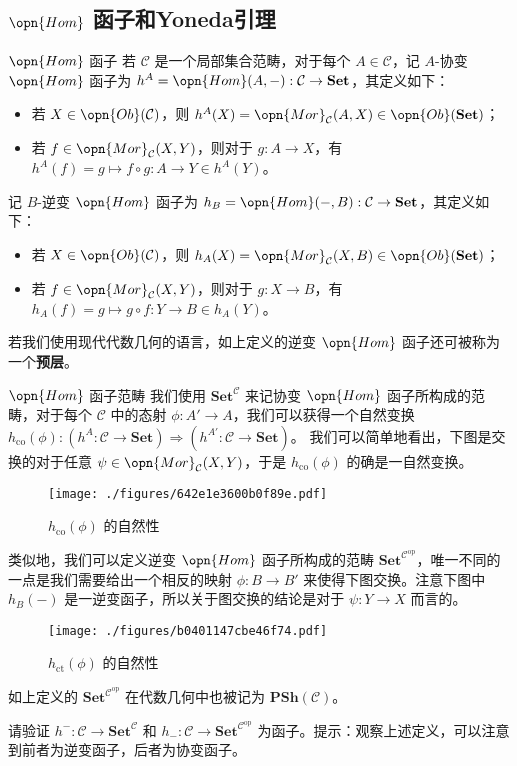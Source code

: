 \subsection{$\opn{Hom}$ 函子和Yoneda引理}
\begin{definition}{$\opn{Hom}$ 函子}
若 $\mathcal{C}$ 是一个局部集合范畴，对于每个 $A\in\mathcal{C}$，记 $A$-协变 $\opn{Hom}$ 函子为 $h^A=\opn{Hom}(A,-):\mathcal{C}\to\mathbf{Set}$，其定义如下：
\begin{itemize}
\item 若 $X\in\opn{Ob}(\mathcal{C})$，则 $h^A(X)=\opn{Mor}_\mathcal{C}(A,X)\in\opn{Ob}(\mathbf{Set})$；
\item 若 $f\in\opn{Mor}_\mathcal{C}(X,Y)$，则对于 $g:A\to X$，有 $h^A(f)=g\mapsto f\circ g:A\to Y\in h^A(Y)$。
\end{itemize}

记 $B$-逆变 $\opn{Hom}$ 函子为 $h_B=\opn{Hom}(-,B):\mathcal{C}\to\mathbf{Set}$，其定义如下：
\begin{itemize}
\item 若 $X\in\opn{Ob}(\mathcal{C})$，则 $h_A(X)=\opn{Mor}_\mathcal{C}(X,B)\in\opn{Ob}(\mathbf{Set})$；
\item 若 $f\in\opn{Mor}_\mathcal{C}(X,Y)$，则对于 $g:X\to B$，有 $h_A(f)=g\mapsto g\circ f:Y\to B\in h_A(Y)$。
\end{itemize}
\end{definition}
若我们使用现代代数几何的语言，如上定义的逆变 $\opn{Hom}$ 函子还可被称为一个\textbf{预层}。
\begin{definition}{$\opn{Hom}$ 函子范畴}
我们使用 $\mathbf{Set}^\mathcal{C}$ 来记协变 $\opn{Hom}$ 函子所构成的范畴，对于每个 $\mathcal{C}$ 中的态射 $\phi:A'\to A$，我们可以获得一个自然变换 $h_{\text{co}}(\phi):(h^A:\mathcal{C}\to\mathbf{Set})\Rightarrow(h^{A'}:\mathcal{C}\to\mathbf{Set})$。
我们可以简单地看出，下图是交换的对于任意 $\psi\in\opn{Mor}_\mathcal{C}(X,Y)$，于是 $h_\text{co}(\phi)$ 的确是一自然变换。
\begin{figure}[h!]
\centering
\texttt{[image: ./figures/642e1e3600b0f89e.pdf]}
\caption{$h_{\text{co}}(\phi)$ 的自然性} \label{fig_Cat_1}
\end{figure}
类似地，我们可以定义逆变 $\opn{Hom}$ 函子所构成的范畴 $\mathbf{Set}^{\mathcal{C}^\text{op}}$，唯一不同的一点是我们需要给出一个相反的映射 $\phi:B\to B'$ 来使得下图交换。注意下图中 $h_B(-)$ 是一逆变函子，所以关于图交换的结论是对于 $\psi:Y\to X$ 而言的。
\begin{figure}[ht]
\centering
\texttt{[image: ./figures/b0401147cbe46f74.pdf]}
\caption{$h_{\text{ct}}(\phi)$ 的自然性} \label{fig_Cat_2}
\end{figure}
\end{definition}
如上定义的 $\mathbf{Set}^{\mathcal{C}^\text{op}}$ 在代数几何中也被记为 $\mathbf{PSh}(\mathcal{C})$。
\begin{exercise}{}
请验证 $h^{-}:\mathcal{C}\to\mathbf{Set}^\mathcal{C}$ 和 $h_{-}:\mathcal{C}\to\mathbf{Set}^{\mathcal{C}^\text{op}}$ 为函子。提示：观察上述定义，可以注意到前者为逆变函子，后者为协变函子。
\end{exercise}

